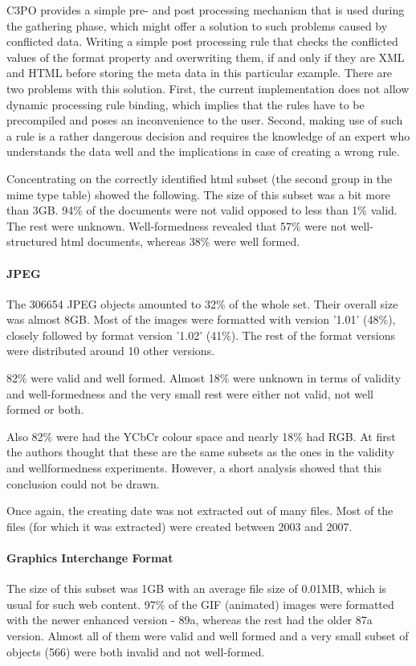 C3PO provides a simple pre- and post processing mechanism that is used during the gathering phase, which might offer a solution to such problems caused by conflicted data. Writing a simple post processing rule that checks the conflicted values of the format property and overwriting them, if and only if they are XML and HTML before storing the meta data in this particular example. There are two problems with this solution. First, the current implementation does not allow dynamic processing rule binding, which implies that the rules have to be precompiled and poses an inconvenience to the user. Second, making use of such a rule is a rather dangerous decision and requires the knowledge of an expert who understands the data well and the implications in case of creating a wrong rule.

Concentrating on the correctly identified html subset (the second group in the mime type table) showed the following.
The size of this subset was a bit more than 3GB. 94\% of the documents were not valid opposed to less than 1\% valid. The rest were unknown. Well-formedness revealed that 57\% were not well-structured html documents, whereas 38\% were well formed.

\paragraph{JPEG}
The 306654 JPEG objects amounted to 32\% of the whole set. Their overall size was almost 8GB.
Most of the images were formatted with version '1.01' (48\%), closely followed by format version '1.02' (41\%). The rest of the format versions were distributed around 10 other versions.

82\% were valid and well formed. Almost 18\% were unknown in terms of validity and well-formedness and the very small rest were either not valid, not well formed or both.

Also 82\% were had the YCbCr colour space and nearly 18\% had RGB. At first the authors thought that these are the same subsets as the ones in the validity and wellformedness experiments. However, a short analysis showed that this conclusion could not be drawn.

Once again, the creating date was not extracted out of many files. Most of the files (for which it was extracted) were created between 2003 and 2007.

\paragraph{Graphics Interchange Format}
The size of this subset was 1GB with an average file size of 0.01MB, which is usual for such web content.
97\% of the GIF (animated) images were formatted with the newer enhanced version - 89a, whereas the rest had the older 87a version. Almost all of them were valid and well formed and a very small subset of objects (566) were both invalid and not well-formed.

